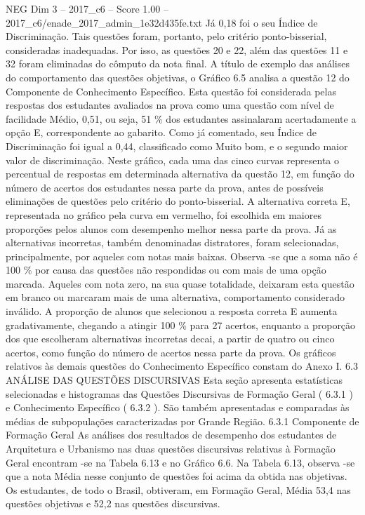 \begin{textsample}{NEG Dim 3 – 2017\_c6 – Score 1.00 – 2017\_c6/enade\_2017\_admin\_1e32d435fe.txt}
Já 0,18 foi o seu Índice de Discriminação.
Tais questões foram, portanto, pelo critério ponto-bisserial, consideradas inadequadas.
Por isso, as questões 20 e 22, além das questões 11 e 32 foram eliminadas do cômputo da nota final.
A título de exemplo das análises do comportamento das questões objetivas, o Gráfico 6.5 analisa a questão 12 do Componente de Conhecimento Específico.
Esta questão foi considerada pelas respostas dos estudantes avaliados na prova como uma questão com nível de facilidade Médio, 0,51, ou seja, 51 \% dos estudantes assinalaram acertadamente a opção E, correspondente ao gabarito.
Como já comentado, seu Índice de Discriminação foi igual a 0,44, classificado como Muito bom, e o segundo maior valor de discriminação.
Neste gráfico, cada uma das cinco curvas representa o percentual de respostas em determinada alternativa da questão 12, em função do número de acertos dos estudantes nessa parte da prova, antes de possíveis eliminações de questões pelo critério do ponto-bisserial.
A alternativa correta E, representada no gráfico pela curva em vermelho, foi escolhida em maiores proporções pelos alunos com desempenho melhor nessa parte da prova.
Já as alternativas incorretas, também denominadas distratores, foram selecionadas, principalmente, por aqueles com notas mais baixas.
Observa -se que a soma não é 100 \% por causa das questões não respondidas ou com mais de uma opção marcada.
Aqueles com nota zero, na sua quase totalidade, deixaram esta questão em branco ou marcaram mais de uma alternativa, comportamento considerado inválido.
A proporção de alunos que selecionou a resposta correta E aumenta gradativamente, chegando a atingir 100 \% para 27 acertos, enquanto a proporção dos que escolheram alternativas incorretas decai, a partir de quatro ou cinco acertos, como função do número de acertos nessa parte da prova.
Os gráficos relativos às demais questões do Conhecimento Específico constam do Anexo I. 6.3 ANÁLISE DAS QUESTÕES DISCURSIVAS Esta seção apresenta estatísticas selecionadas e histogramas das Questões Discursivas de Formação Geral ( 6.3.1 ) e Conhecimento Específico ( 6.3.2 ).
São também apresentadas e comparadas às médias de subpopulações caracterizadas por Grande Região. 6.3.1 Componente de Formação Geral As análises dos resultados de desempenho dos estudantes de Arquitetura e Urbanismo nas duas questões discursivas relativas à Formação Geral encontram -se na Tabela 6.13 e no Gráfico 6.6.
Na Tabela 6.13, observa -se que a nota Média nesse conjunto de questões foi acima da obtida nas objetivas.
Os estudantes, de todo o Brasil, obtiveram, em Formação Geral, Média 53,4 nas questões objetivas e 52,2 nas questões discursivas.

\end{textsample}
